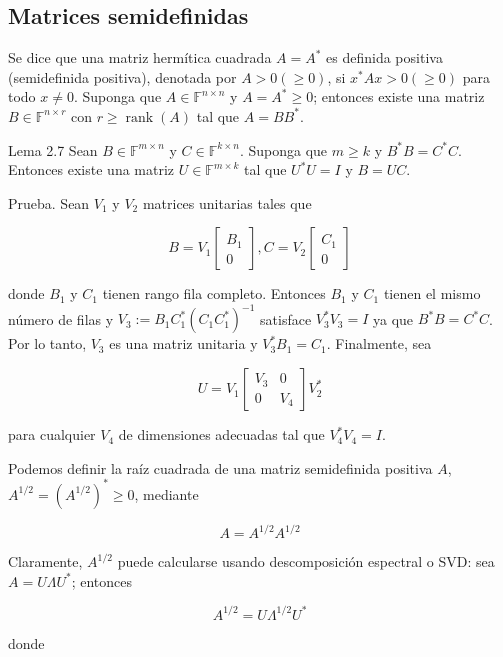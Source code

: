\documentclass[11pt]{article}
\begin{document}
\subsection*{Matrices semidefinidas}
Se dice que una matriz hermítica cuadrada $A=A^{*}$ es definida positiva (semidefinida positiva), denotada por $A>0(\geq 0)$, si $x^{*} A x>0(\geq 0)$ para todo $x \neq 0$. Suponga que $A \in \mathbb{F}^{n \times n}$ y $A=A^{*} \geq 0$; entonces existe una matriz $B \in \mathbb{F}^{n \times r}$ con $r \geq \operatorname{rank}(A)$ tal que $A=B B^{*}$.

Lema 2.7 Sean $B \in \mathbb{F}^{m \times n}$ y $C \in \mathbb{F}^{k \times n}$. Suponga que $m \geq k$ y $B^{*} B=C^{*} C$. Entonces existe una matriz $U \in \mathbb{F}^{m \times k}$ tal que $U^{*} U=I$ y $B=U C$.

Prueba. Sean $V_{1}$ y $V_{2}$ matrices unitarias tales que

$$
B=V_{1}\left[\begin{array}{c}
B_{1} \\
0
\end{array}\right], C=V_{2}\left[\begin{array}{c}
C_{1} \\
0
\end{array}\right]
$$

donde $B_{1}$ y $C_{1}$ tienen rango fila completo. Entonces $B_{1}$ y $C_{1}$ tienen el mismo número de filas y $V_{3}:=B_{1} C_{1}^{*}\left(C_{1} C_{1}^{*}\right)^{-1}$ satisface $V_{3}^{*} V_{3}=I$ ya que $B^{*} B=C^{*} C$. Por lo tanto, $V_{3}$ es una matriz unitaria y $V_{3}^{*} B_{1}=C_{1}$. Finalmente, sea

$$
U=V_{1}\left[\begin{array}{cc}
V_{3} & 0 \\
0 & V_{4}
\end{array}\right] V_{2}^{*}
$$

para cualquier $V_{4}$ de dimensiones adecuadas tal que $V_{4}^{*} V_{4}=I$.

Podemos definir la raíz cuadrada de una matriz semidefinida positiva $A$, $A^{1 / 2}=\left(A^{1 / 2}\right)^{*} \geq 0$, mediante

$$
A=A^{1 / 2} A^{1 / 2}
$$

Claramente, $A^{1 / 2}$ puede calcularse usando descomposición espectral o SVD: sea $A=U \Lambda U^{*}$; entonces

$$
A^{1 / 2}=U \Lambda^{1 / 2} U^{*}
$$

donde
\end{document}
